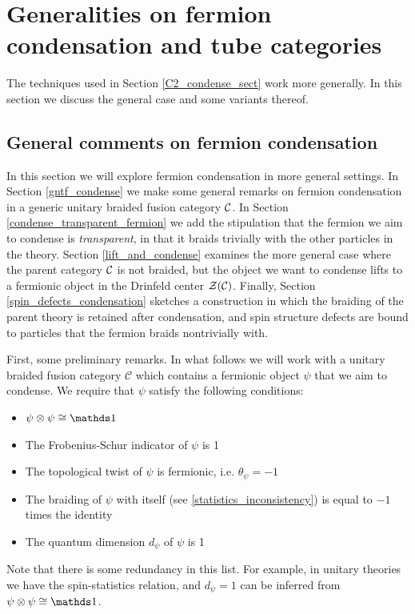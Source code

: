 
\section{Generalities on fermion condensation and tube categories} \label{generalities} 

The techniques used in Section \ref{C2_condense_sect} work more generally.
In this section we discuss the general case and some variants thereof.

\subsection{General comments on fermion condensation}
\label{General_comments_on_fermion_condensation}

In this section we will explore fermion condensation in more general settings. 
In Section \ref{gntf_condense} we make some general remarks on fermion condensation in a
generic unitary braided fusion category $\mathcal{C}$. 
In Section \ref{condense_transparent_fermion} we add the stipulation that the fermion we aim 
to condense is {\it transparent}, in that it braids trivially with the other particles in the theory. 
Section \ref{lift_and_condense} examines the more general case where the parent category $\mathcal{C}$ is not braided,
but the object we want to condense lifts to a fermionic object in the Drinfeld center $\mathcal{Z}(\mathcal{C})$.
Finally, Section \ref{spin_defects_condensation} sketches a construction in which the braiding 
of the parent theory is retained after condensation, and spin structure defects are bound to 
particles that the fermion braids nontrivially with. 

First, some preliminary remarks. 
In what follows we will work with a 
unitary braided fusion category $\mathcal{C}$ which contains a fermionic object $\psi$ that we aim to condense. 
We require that $\psi$ satisfy the following conditions:
\begin{itemize} 
	\item $\psi\ot\psi\cong\unit$
	\item The Frobenius-Schur indicator of $\psi$ is 1
	\item The topological twist of $\psi$ is fermionic, i.e. $\theta_\psi =-1$
	\item The braiding of $\psi$ with itself (see \eqref{statistics_inconsistency}) is equal to $-1$ times the identity
	\item The quantum dimension $d_\psi$ of $\psi$ is 1
\end{itemize}
Note that there is some redundancy in this list.
For example, 
in unitary theories we have the spin-statistics relation, and $d_\psi=1$ can be inferred from $\psi\tp\psi \cong \unit$.

